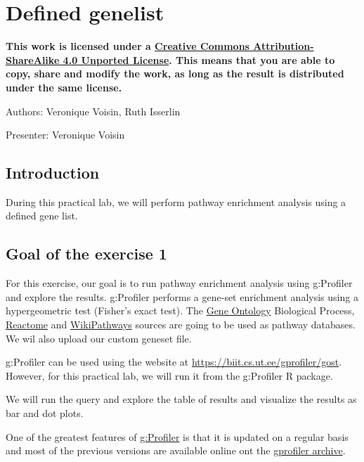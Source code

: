 \documentclass[
]{book}
\begin{document}
\chapter*{Defined genelist}\label{defined-genelist}

\textbf{This work is licensed under a \href{https://creativecommons.org/licenses/by-sa/4.0/deed.en}{Creative Commons Attribution-ShareAlike 4.0 Unported License}. This means that you are able to copy, share and modify the work, as long as the result is distributed under the same license.}

Authors: Veronique Voisin, Ruth Isserlin

Presenter: Veronique Voisin

\section{Introduction}\label{introduction}

During this practical lab, we will perform pathway enrichment analysis using a defined gene list.

\section{Goal of the exercise 1}\label{goal-of-the-exercise-1}

For this exercise, our goal is to run pathway enrichment analysis using g:Profiler and explore the results.
g:Profiler performs a gene-set enrichment analysis using a hypergeometric test (Fisher's exact test). The \href{http://geneontology.org/}{Gene Ontology} Biological Process, \href{https://reactome.org/}{Reactome} and \href{https://www.wikipathways.org/}{WikiPathways} sources are going to be used as pathway databases.
We wil also upload our custom geneset file.

g:Profiler can be used using the website at \url{https://biit.cs.ut.ee/gprofiler/gost}. However, for this practical lab, we will run it from the g:Profiler R package.

We will run the query and explore the table of results and visualize the results as bar and dot plots.

One of the greatest features of \href{https://biit.cs.ut.ee/gprofiler/gost}{g:Profiler} is that it is updated on a regular basis and most of the previous versions are available online ont the \href{https://biit.cs.ut.ee/gprofiler/page/archives}{gprofiler archive}.
\end{document}
